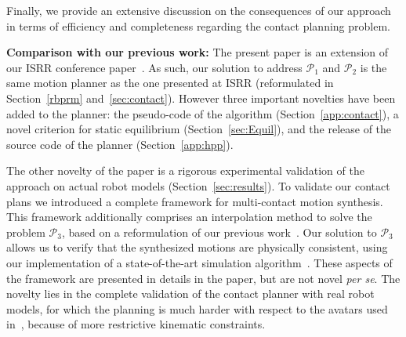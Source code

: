 \documentclass[journal]{IEEEtran}
\providecommand{\DIFaddtex}[1]{#1} %
\providecommand{\DIFdeltex}[1]{} %
\providecommand{\DIFaddbegin}{\protect\color{blue}} %
\providecommand{\DIFaddend}{\protect\color{black}} %
\providecommand{\DIFdelbegin}{\protect\cbdelete} %
\providecommand{\DIFdelend}{} %
\providecommand{\DIFadd}[1]{\texorpdfstring{\DIFaddtex{#1}}{#1}} %
\providecommand{\DIFdel}[1]{\texorpdfstring{\DIFdeltex{#1}}{}} %
\begin{document}
Finally, we provide an extensive discussion on the consequences of our approach in terms of efficiency and completeness regarding the contact planning problem. \DIFaddbegin \\
\DIFaddend 

\DIFdelbegin \DIFdel{The paper extends our previous papers presenting the reachability condition~\cite{tonneauisrr15}}\DIFdelend \DIFaddbegin \noindent \DIFadd{\textbf{Comparison with our previous work:}
The present paper is an extension of our ISRR conference paper~\cite{tonneauisrr15}. 
As such, our solution to address $\mathcal{P}_1$ and $\mathcal{P}_2$ is the same motion planner as the one presented at ISRR (reformulated in Section~\ref{rbprm} and~\ref{sec:contact}). 
However three important novelties have been added to the planner: the pseudo-code of the algorithm (Section~\ref{app:contact}), a novel criterion for
static equilibrium (Section~\ref{sec:Equil}), }\DIFaddend and \DIFdelbegin \DIFdel{the connection of our contact planner with a solver~$\mathcal{P}_3$~\cite{Carpentier2016}. 
In this paper, we introduce a new efficient criterion of the robot balance, provide the complete pseudo-code and release our source code that can be used to directly reproduce our results. We also provide a }\DIFdelend \DIFaddbegin \DIFadd{the release of the source code of the planner (Section~\ref{app:hpp}).
}

\DIFadd{The other novelty of the paper is a rigorous experimental validation of the approach on actual robot models (Section~\ref{sec:results}).
To validate our contact plans we introduced a complete framework for multi-contact motion synthesis. This framework additionally comprises an interpolation method to solve the problem $\mathcal{P}_3$,  based on a reformulation of our previous work~\cite{Carpentier2016}. Our }\DIFaddend solution to $\mathcal{P}_3$ \DIFaddbegin \DIFadd{allows us to verify that the synthesized motions are physically consistent, using our implementation of a state-of-the-art simulation algorithm~\cite{Kaufman2008}. 
These aspects of the framework are presented in details in the
paper, but are not novel \textit{per se}}\DIFaddend . \DIFdelbegin \DIFdel{The planner is validated on robot modelsof HyQ and HRP-2 (while \cite{tonneauisrr15} used unrealistic avatar models) with complete performance analysis}\DIFdelend %
\DIFaddbegin \DIFadd{The novelty lies in the complete
validation of the contact planner with real robot models, for
which the planning is much harder with respect to the avatars
used in~\cite{tonneauisrr15}, because of more restrictive kinematic constraints}\DIFaddend .
\end{document}
